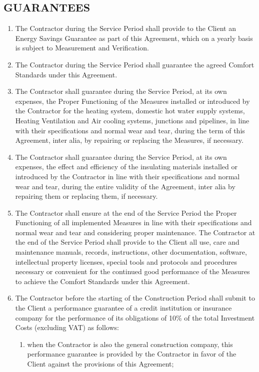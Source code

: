 \begin{multicols}{2}
\subsection{GUARANTEES}
\begin{enumerate}
	\item	The Contractor during the Service Period shall provide to the Client an Energy Savings Guarantee as part of this Agreement, which on a yearly basis is subject to Measurement and Verification.
	\item	The Contractor during the Service Period shall guarantee the agreed Comfort Standards under this Agreement.
	\item	The Contractor shall guarantee during the Service Period, at its own expenses, the Proper Functioning of the Measures installed or introduced by the Contractor for the heating system, domestic hot water supply systems, Heating Ventilation and Air cooling systems, junctions and pipelines, in line with their specifications and normal wear and tear, during the term of this Agreement, inter alia, by repairing or replacing the Measures, if necessary.
	\item	The Contractor shall guarantee during the Service Period, at its own expenses, the effect and efficiency of the insulating materials installed or introduced by the Contractor in line with their specifications and normal wear and tear, during the entire validity of the Agreement, inter alia by repairing them or replacing them, if necessary.
	\item	The Contractor shall ensure at the end of the Service Period the Proper Functioning of all implemented Measures in line with their specifications and normal wear and tear and considering proper maintenance. The Contractor at the end of the Service Period shall provide to the Client all use, care and maintenance manuals, records, instructions, other documentation, software, intellectual property licenses, special tools and protocols and procedures necessary or convenient for the continued good performance of the Measures to achieve the Comfort Standards under this Agreement.
	\item	The Contractor before the starting of the Construction Period shall submit to the Client a performance guarantee of a credit institution or insurance company for the performance of its obligations of 10\% of the total Investment Costs (excluding VAT) as follows:
	\begin{enumerate}
		\item	when the Contractor is also the general construction company, this performance guarantee is provided by the Contractor in favor of the Client against the provisions of this Agreement;

\end{enumerate}
\end{enumerate}
\end{multicols}
